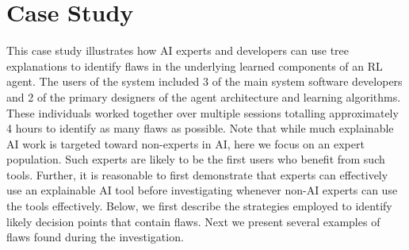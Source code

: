 \documentclass{article}
\begin{document}



\section{Case Study}
\label{sec:case-study}

This case study illustrates how AI experts and developers can use tree explanations to identify flaws in the underlying learned components of an RL agent. The users of the system included 3 of the main system software developers and 2 of the primary designers of the agent architecture and learning algorithms. These individuals worked together over multiple sessions totalling approximately 4 hours to identify as many flaws as possible. Note that while much explainable AI work is targeted toward non-experts in AI, here we focus on an expert population. 
Such experts are likely to be the first users who benefit from such tools. Further, it is reasonable to first demonstrate that experts can effectively use an explainable AI tool before investigating whenever non-AI experts can use the tools effectively.
%
Below, we first describe the strategies employed to identify likely decision points that contain flaws. Next we present several examples of flaws found during the investigation.  


\end{document}
